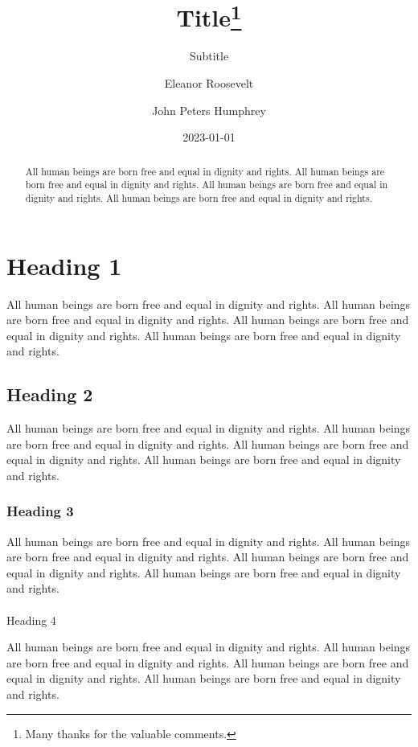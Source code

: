 \documentclass[
  ngerman,
  american,
  letterpaper,
  DIV=11,
  numbers=noendperiod]{scrartcl}
\title{Title\thanks{Many thanks for the valuable comments.}}
\subtitle{Subtitle}
\author{Eleanor Roosevelt \and John Peters Humphrey}
\date{2023-01-01}
\makeatletter
\let\oldparagraph\paragraph
\renewcommand{\paragraph}{
    \@ifstar
      \xxxParagraphStar
      \xxxParagraphNoStar
  }
\newcommand{\xxxParagraphStar}[1]{\oldparagraph*{#1}\mbox{}}
\newcommand{\xxxParagraphNoStar}[1]{\oldparagraph{#1}\mbox{}}
\makeatother
\begin{document}
\maketitle
\begin{abstract}
All human beings are born free and equal in dignity and rights. All
human beings are born free and equal in dignity and rights. All human
beings are born free and equal in dignity and rights. All human beings
are born free and equal in dignity and rights.
\end{abstract}


\section{Heading 1}\label{heading-1}

All human beings are born free and equal in dignity and rights. All
human beings are born free and equal in dignity and rights. All human
beings are born free and equal in dignity and rights. All human beings
are born free and equal in dignity and rights.

\subsection{Heading 2}\label{heading-2}

All human beings are born free and equal in dignity and rights. All
human beings are born free and equal in dignity and rights. All human
beings are born free and equal in dignity and rights. All human beings
are born free and equal in dignity and rights.

\subsubsection{Heading 3}\label{heading-3}

All human beings are born free and equal in dignity and rights. All
human beings are born free and equal in dignity and rights. All human
beings are born free and equal in dignity and rights. All human beings
are born free and equal in dignity and rights.

\paragraph{Heading 4}\label{heading-4}

All human beings are born free and equal in dignity and rights. All
human beings are born free and equal in dignity and rights. All human
beings are born free and equal in dignity and rights. All human beings
are born free and equal in dignity and rights.
\end{document}
